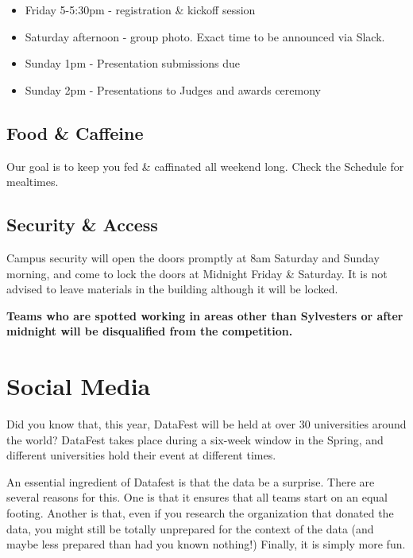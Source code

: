 \documentclass[]{article}
\providecommand{\tightlist}{%
  \setlength{\itemsep}{0pt}\setlength{\parskip}{0pt}}
\begin{document}
\begin{itemize}
\tightlist
\item
  Friday 5-5:30pm - registration \& kickoff session
\item
  Saturday afternoon - group photo. Exact time to be announced via
  Slack.
\item
  Sunday 1pm - Presentation submissions due
\item
  Sunday 2pm - Presentations to Judges and awards ceremony
\end{itemize}

\hypertarget{food-caffeine}{%
\subsection{Food \& Caffeine}\label{food-caffeine}}

Our goal is to keep you fed \& caffinated all weekend long. Check the
Schedule for mealtimes.

\hypertarget{security-access}{%
\subsection{Security \& Access}\label{security-access}}

Campus security will open the doors promptly at 8am Saturday and Sunday
morning, and come to lock the doors at Midnight Friday \& Saturday. It
is not advised to leave materials in the building although it will be
locked.

\textbf{Teams who are spotted working in areas other than Sylvesters or
after midnight will be disqualified from the competition.}

\hypertarget{social-media}{%
\section{Social Media}\label{social-media}}

Did you know that, this year, DataFest will be held at over 30
universities around the world? DataFest takes place during a six-week
window in the Spring, and different universities hold their event at
different times.

An essential ingredient of Datafest is that the data be a surprise.
There are several reasons for this. One is that it ensures that all
teams start on an equal footing. Another is that, even if you research
the organization that donated the data, you might still be totally
unprepared for the context of the data (and maybe less prepared than had
you known nothing!) Finally, it is simply more fun.
\end{document}
